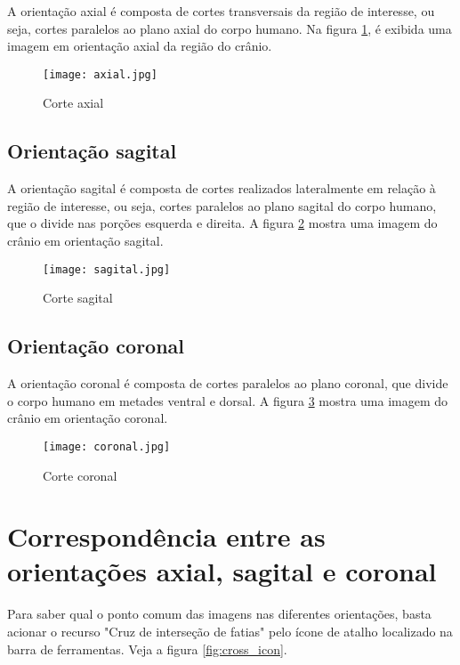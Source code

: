 A orientação axial é composta de cortes transversais da região
de interesse, ou seja, cortes paralelos ao plano axial do corpo humano.
Na figura \ref{fig:axial_corte}, é exibida uma imagem em orientação axial da
região do crânio.

\begin{figure}[!htb]
\centering
\texttt{[image: axial.jpg]}
\caption{Corte axial}
\label{fig:axial_corte}
\end{figure}

\subsection{Orientação sagital}

A orientação sagital é composta de cortes realizados lateralmente
em relação à região de interesse, ou seja, cortes paralelos ao plano sagital do corpo humano,
que o divide nas porções esquerda e direita.
A figura \ref{fig:sagital_slice} mostra uma imagem do crânio em orientação sagital.

\begin{figure}[!htb]
\centering
\texttt{[image: sagital.jpg]}
\caption{Corte sagital}
\label{fig:sagital_slice}
\end{figure}

\newpage

\subsection{Orientação coronal}

A orientação coronal é composta de cortes paralelos ao plano coronal,
que divide o corpo humano em metades ventral e dorsal.
A figura \ref{fig:coronal_slice} mostra uma imagem do crânio em orientação
coronal.

\begin{figure}[!htb]
\centering
\texttt{[image: coronal.jpg]}
\caption{Corte coronal}
\label{fig:coronal_slice}
\end{figure}


\section{Correspondência entre as orientações axial, sagital e coronal}

Para saber qual o ponto comum das imagens nas diferentes orientações, basta acionar o
recurso "Cruz de interseção de fatias" pelo ícone de atalho localizado na barra de ferramentas.
Veja a figura \ref{fig:cross_icon}.


